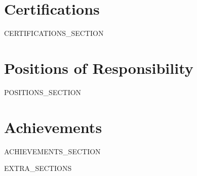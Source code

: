 \documentclass[a4paper,12pt]{article}
\makeatletter
\newcommand{\resumeItem}[2]{
  \item{
    \textbf{#1}{:\hspace{0.5mm}#2 \vspace{-0.5mm}}
  }
}
\newcommand{\resumeSubheading}[4]{
\vspace{0.5mm}\item
    \begin{tabular*}{0.98\textwidth}[t]{l@{\extracolsep{\fill}}r}
        \textbf{#1} & \textit{\footnotesize{#4}} \\
        \textit{\footnotesize{#3}} &  \footnotesize{#2}\\
    \end{tabular*}
    \vspace{-2.4mm}
}
\newcommand{\resumeSubItem}[2]{\resumeItem{#1}{#2}\vspace{-4pt}}
\newcommand{\resumeSubHeadingListStart}{\begin{itemize}[leftmargin=*,labelsep=0mm]}
\newcommand{\resumeHeadingSkillStart}{\begin{itemize}[leftmargin=*,itemsep=1.7mm, rightmargin=2ex]}
\newcommand{\resumeItemListStart}{\begin{justify}\begin{itemize}[leftmargin=3ex, rightmargin=2ex, noitemsep,labelsep=1.2mm,itemsep=0mm]\small}
\newcommand{\resumeSubHeadingListEnd}{\end{itemize}\vspace{2mm}}
\newcommand{\resumeHeadingSkillEnd}{\end{itemize}\vspace{-2mm}}
\newcommand{\resumeItemListEnd}{\end{itemize}\end{justify}\vspace{-2mm}}
\makeatother
\begin{document}
\vspace{-1.5mm}

\vspace{-1mm}

\section{\textbf{Certifications}}
    \resumeItemListStart
{{CERTIFICATIONS_SECTION}}
    \resumeItemListEnd
\vspace{-4mm}

\section{\textbf{Positions of Responsibility}}
\vspace{-0.4mm}
\resumeSubHeadingListStart
{{POSITIONS_SECTION}}
\resumeSubHeadingListEnd
\vspace{-4mm}

\section{\textbf{Achievements}}
\vspace{-0.1mm}
\resumeItemListStart
{{ACHIEVEMENTS_SECTION}}
\resumeItemListEnd

{{EXTRA_SECTIONS}}
\end{document}
